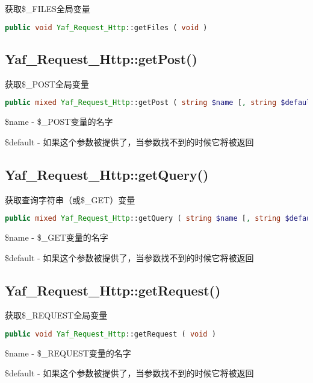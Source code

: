 获取\$\_FILES全局变量

\begin{lstlisting}[language=PHP]
public void Yaf_Request_Http::getFiles ( void )
\end{lstlisting}

\subsection{Yaf\_Request\_Http::getPost()}

获取\$\_POST全局变量
\begin{lstlisting}[language=PHP]
public mixed Yaf_Request_Http::getPost ( string $name [, string $default ] )
\end{lstlisting}

\begin{compactitem}
\item \$name - \$\_POST变量的名字
\item \$default - 如果这个参数被提供了，当参数找不到的时候它将被返回
\end{compactitem}

\subsection{Yaf\_Request\_Http::getQuery()}

获取查询字符串（或\$\_GET）变量

\begin{lstlisting}[language=PHP]
public mixed Yaf_Request_Http::getQuery ( string $name [, string $default ] )
\end{lstlisting}

\begin{compactitem}
\item \$name - \$\_GET变量的名字
\item \$default - 如果这个参数被提供了，当参数找不到的时候它将被返回
\end{compactitem}


\subsection{Yaf\_Request\_Http::getRequest()}

获取\$\_REQUEST全局变量

\begin{lstlisting}[language=PHP]
public void Yaf_Request_Http::getRequest ( void )
\end{lstlisting}

\begin{compactitem}
\item \$name - \$\_REQUEST变量的名字
\item \$default - 如果这个参数被提供了，当参数找不到的时候它将被返回
\end{compactitem}

